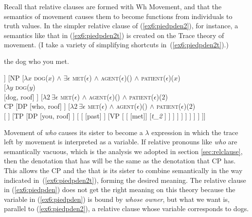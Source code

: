 	Recall that relative clauses are formed with Wh Movement, and that the semantics of movement causes them to become functions from individuals to truth values. In the simpler relative clause of (\ref{ex6:piedpden2}), for instance, a semantics like that in (\ref{ex6:piedpden2t}) is created on the Trace theory of movement. (I take a variety of simplifying shortcuts in~(\ref{ex6:piedpden2t}).)
	\medskip
	\begin{fullwidth}
	\begin{exe}
	\raggedright
		\ex \label{ex6:piedpden2} the dog who you met.
		\ex \label{ex6:piedpden2t}
		\small
		\begin{forest}
		[DP [\ibar{D}
			[\obar{D} [the]]
			[NP [$\lambda x$ \textsc{dog}($x$) $\wedge$ $\exists \epsilon$ \textsc{met}($\epsilon$) $\wedge$ \textsc{agent}($\epsilon$)() $\wedge$ \textsc{patient}($\epsilon$)($x$)\\
				[$\lambda y$ \textsc{dog}($y$)\\ ]
				[$\lambda 2\ \exists \epsilon$ \textsc{met}($\epsilon$) $\wedge$ \textsc{agent}($\epsilon$)() $\wedge$ \textsc{patient}($\epsilon$)($2$)\\CP
					[DP [who, roof] ]
					[$\lambda 2\ \exists \epsilon$ \textsc{met}($\epsilon$) $\wedge$ \textsc{agent}($\epsilon$)() $\wedge$ \textsc{patient}($\epsilon$)($2$)\\
						[ ]
						[TP
							[DP [you, roof] ]
							[
								[ [past] ]
								[VP [
									[ [met]]
									[\emph{t_2} ]
								] ]
							 ]
						 ]
					 ]
				 ]
			] ]
		]]
		\end{forest}
	\end{exe}
\end{fullwidth}
\medskip
Movement of \emph{who} causes its sister  to become a $\lambda$ expression in which the trace left by movement is interpreted as a variable. If relative pronouns like \emph{who} are semantically vacuous, which is the analysis we adopted in section \ref{sec:relclause}, then the denotation that  has will be the same as the denotation that CP has. This allows the CP and the  that is its sister to combine semantically in the way indicated in~(\ref{ex6:piedpden2t}), forming the desired meaning. The relative clause in (\ref{ex6:piedpden}) does not get the right meaning on this theory because the variable in (\ref{ex6:piedpden}) is bound by \emph{whose owner}, but what we want is, parallel to (\ref{ex6:piedpden2}), a relative clause whose variable corresponds to dogs.
\pagebreak

